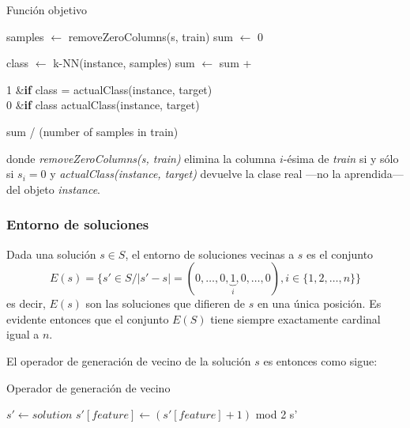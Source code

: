 \documentclass[a4paper, 11pt, titlepage]{article}
\begin{document}
    \begin{algorithm}
        \caption{Función objetivo}\label{f_objetivo}
        \begin{algorithmic}[1]
            \State samples $\gets$ removeZeroColumns(s, train)
            \State sum $\gets$ 0

                \State class $\gets$ k-NN(instance, samples)
                \State sum $\gets$ sum + \begin{cases}
                        1 &\textrm{\textbf{if} } \textrm{class} = \textrm{actualClass(instance, target)} \\
                        0 &\textrm{\textbf{if} } \textrm{class} \neq \textrm{actualClass(instance, target)}
                    \end{cases}
            \EndFor

            \State \Return sum / (number of samples in train)
            \EndFunction
        \end{algorithmic}
    \end{algorithm}
    donde \emph{removeZeroColumns(s, train)} elimina la columna $i$-ésima de \emph{train} si y sólo si $s_i = 0$ y \emph{actualClass(instance, target)} devuelve la clase real ---no la aprendida--- del objeto \emph{instance}.


    \subsubsection*{Entorno de soluciones}
    Dada una solución $s \in S$, el entorno de soluciones vecinas a $s$ es el conjunto
    \[
    E(s) = \{s' \in S / \vert s' - s \vert = (0, \dots, 0, \underbrace{1}_i, 0, \dots, 0), i\in\{1,2, \dots, n\}\}
    \]
    es decir, $E(s)$ son las soluciones que difieren de $s$ en una única posición. Es evidente entonces que el conjunto $E(S)$ tiene siempre exactamente cardinal igual a $n$.

    El operador de generación de vecino de la solución $s$ es entonces como sigue:
    \begin{algorithm}
        \caption{Operador de generación de vecino}\label{flip}
        \begin{algorithmic}[1]
            \State $s' \gets solution$
            \State $s'[feature] \gets (s'[feature] + 1)$ mod 2
            \State \Return s'
            \EndFunction
        \end{algorithmic}
    \end{algorithm}
\end{document}
